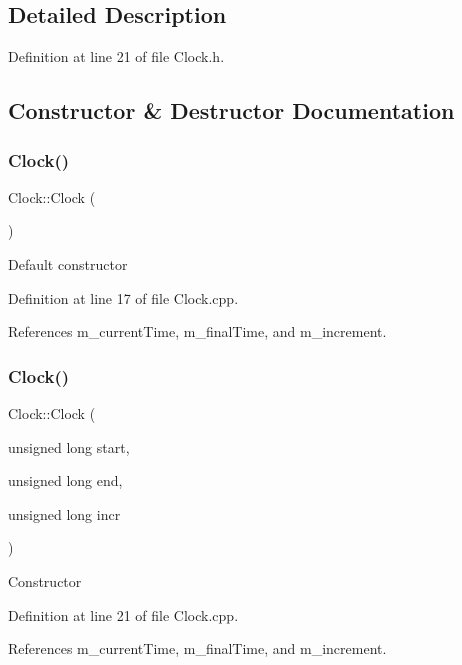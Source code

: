\subsection{Detailed Description}


Definition at line 21 of file Clock.\+h.



\subsection{Constructor \& Destructor Documentation}
\mbox{\label{class_clock_adbc370eb6b5f8d01645cf440188160a8}} 
\subsubsection{Clock()\hspace{0.1cm}{\footnotesize\ttfamily [1/2]}}
{\footnotesize\ttfamily Clock\+::\+Clock (\begin{DoxyParamCaption}{ }\end{DoxyParamCaption})}

Default constructor 

Definition at line 17 of file Clock.\+cpp.



References m\+\_\+current\+Time, m\+\_\+final\+Time, and m\+\_\+increment.

\mbox{\label{class_clock_a89a798e152f8eba2f6eb80ec92b26ece}} 
\subsubsection{Clock()\hspace{0.1cm}{\footnotesize\ttfamily [2/2]}}
{\footnotesize\ttfamily Clock\+::\+Clock (\begin{DoxyParamCaption}\item[{unsigned long}]{start,  }\item[{unsigned long}]{end,  }\item[{unsigned long}]{incr }\end{DoxyParamCaption})}

Constructor 

Definition at line 21 of file Clock.\+cpp.



References m\+\_\+current\+Time, m\+\_\+final\+Time, and m\+\_\+increment.

